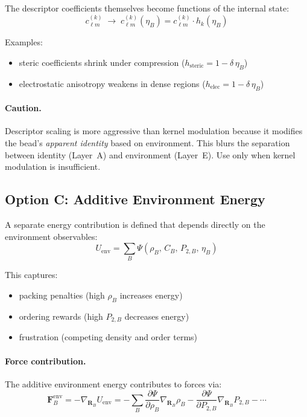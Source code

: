 \documentclass[11pt]{article}
\begin{document}
The descriptor coefficients themselves become functions of the internal
state:
\begin{equation}
    c_{\ell m}^{(k)} \;\longrightarrow\;
    c_{\ell m}^{(k)}(\eta_B)
    = c_{\ell m}^{(k)} \cdot h_k(\eta_B)
\end{equation}

Examples:
\begin{itemize}
    \item steric coefficients shrink under compression
          ($h_{\mathrm{steric}} = 1 - \delta\, \eta_B$)
    \item electrostatic anisotropy weakens in dense regions
          ($h_{\mathrm{elec}} = 1 - \delta\, \eta_B$)
\end{itemize}

\paragraph{Caution.}
Descriptor scaling is more aggressive than kernel modulation because it
modifies the bead's \emph{apparent identity} based on environment.  This
blurs the separation between identity (Layer~A) and environment (Layer~E).
Use only when kernel modulation is insufficient.

\subsection{Option C: Additive Environment Energy}

A separate energy contribution is defined that depends directly on the
environment observables:
\begin{equation}
    U_{\mathrm{env}} = \sum_B
    \Psi(\rho_B,\, C_B,\, P_{2,B},\, \eta_B)
\end{equation}

This captures:
\begin{itemize}
    \item packing penalties (high $\rho_B$ increases energy)
    \item ordering rewards (high $P_{2,B}$ decreases energy)
    \item frustration (competing density and order terms)
\end{itemize}

\paragraph{Force contribution.}
The additive environment energy contributes to forces via:
\begin{equation}
    \mathbf{F}_B^{\mathrm{env}} = -\nabla_{\mathbf{R}_B} U_{\mathrm{env}}
    = -\sum_B \frac{\partial \Psi}{\partial \rho_B}
    \nabla_{\mathbf{R}_B} \rho_B
    - \frac{\partial \Psi}{\partial P_{2,B}}
    \nabla_{\mathbf{R}_B} P_{2,B}
    - \cdots
\end{equation}
\end{document}
